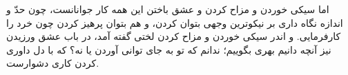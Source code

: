 اما سيكى خوردن و مزاح كردن و عشق باختن اين همه كار جوانانست، چون حدّ و اندازه نگاه دارى بر نيكوترين وجهى بتوان كردن، و هم بتوان پرهيز كردن چون خرد را كارفرمايى. و اندر سيكى خوردن و مزاح كردن لختى گفته آمد، در باب عشق ورزيدن نيز آنچه دانيم بهرى بگوييم؛ ندانم كه تو به جاى توانى آوردن يا نه‌؟ كه با دل داورى كردن كارى دشوارست.


\newpage
























